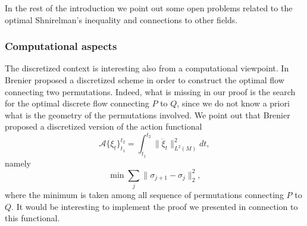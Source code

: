 \documentclass[12 pt]{article}
\theoremstyle{definition} \newtheorem{definition}{Definition}[section]
\theoremstyle{definition} \newtheorem{remark}[definition]{Remark}
\theoremstyle{plain} \newtheorem{lemma}[definition]{Lemma}
\theoremstyle{plain} \newtheorem{proposition}[definition]{Proposition}
\theoremstyle{plain} \newtheorem{theorem}[definition]{Theorem}
\theoremstyle{plain} \newtheorem{corollary}[definition]{Corollary}
\theoremstyle{definition} \newtheorem{example}[definition]{Example}
\theoremstyle{definition} \newtheorem{assumption}[definition]{Assumption}
\theoremstyle{definition} \newtheorem{conjecture}[definition]{Conjecture}
\newcommand{\1}{\mathbbm 1}
\numberwithin{equation}{section}
\begin{document}
\medskip 
   

   



       
         

         In the rest of the introduction we point out some open problems related to the optimal Shnirelman's inequality and connections to other fields.
        




\subsubsection{Computational aspects}
The discretized context is interesting also from a computational viewpoint. In \cite{Brenier2} Brenier proposed a discretized scheme in order to construct the optimal flow connecting two permutations.  Indeed, what is missing in our proof is the search for the optimal discrete flow connecting $P$ to $Q$,  since we do not know a priori what is the geometry of the permutations involved. We point out that 
Brenier proposed a discretized version of the action functional
\begin{equation*}
    \mathcal{A}\lbrace\xi_t\rbrace_{t_1}^{t_2}=\int_{t_1}^{t_2} \|\dot\xi_t\|^2_{L^2(M)}dt,
\end{equation*}
namely
\begin{equation*}
    \min \sum_j \|\sigma_{j+1}-\sigma_j\|^2_2,
\end{equation*}
where the minimum is taken among all sequence of permutations connecting $P$ to $Q$. It would be interesting to implement the proof we presented in connection to this functional.
\end{document}
